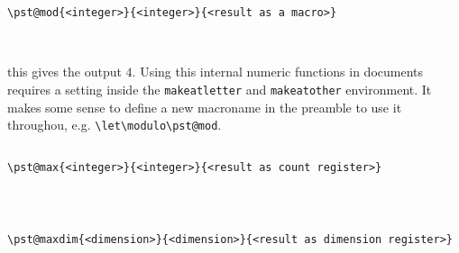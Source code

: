 \begin{verbatim}
\pst@mod{<integer>}{<integer>}{<result as a macro>}
\end{verbatim}

\begin{LTXexample}[width=2cm]
\makeatletter
{}\modulo \modulo\\
\modulo \modulo
\makeatother
\end{LTXexample}

\noindent this gives the output $4$. Using this internal numeric functions in documents
requires a setting inside the \verb+makeatletter+ and \verb+makeatother+ environment.
It makes some sense to define a new macroname in the preamble to use it throughou, e.g.
\verb+\let\modulo\pst@mod+.

\subsection{}

\begin{verbatim}
\pst@max{<integer>}{<integer>}{<result as count register>}
\end{verbatim}

\begin{LTXexample}[width=2cm]
\newcount\maxNo
\makeatletter
{}\maxNo \the\maxNo\\
\maxNo \the\maxNo
\makeatother
\end{LTXexample}


\subsection{}

\begin{verbatim}
\pst@maxdim{<dimension>}{<dimension>}{<result as dimension register>}
\end{verbatim}

\begin{LTXexample}[width=2cm]
\newdimen\maxDim
\makeatletter
\pst@maxdim{34cm}{1234pt}\maxDim \the\maxDim\\
\pst@maxdim{34cm}{123pt}\maxDim \the\maxDim
\makeatother
\end{LTXexample}

